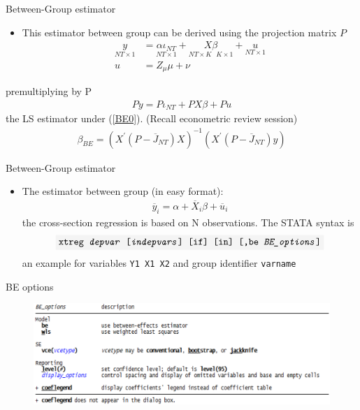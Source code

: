 \begin{frame}{Between-Group estimator}
		\begin{itemize}
			\item This estimator between group can be derived using the projection matrix $P$
					\begin{align*}
						\underset{NT\times 1}{y} & = \underset{NT\times 1}{\alpha \iota 
													 _{NT}}+\underset{NT\times K\text{ }K\times 1}{X\beta }+\underset{NT\times 1}{u} \\
											   u & = Z_{\mu }\mu +\nu
					\end{align*}
		\end{itemize}
	premultiplying by P
		\begin{gather}
			Py=P\iota _{NT}+PX\beta +Pu  \label{BE0}
		\end{gather}
	the LS estimator under (\ref{BE0}). (Recall econometric review session)
		\begin{gather}
			\beta_{BE}=\left( X^{\prime }\left( P-\overline{J}_{NT}\right) X\right)^{-1}\left( X^{\prime}\left( P-\overline{J}_{NT}\right) y\right)
		\end{gather}
\end{frame}
\begin{frame}{Between-Group estimator}
	\begin{itemize}
		\item The estimator between group (in easy format):
			\begin{gather}
				\overline{y}_{i}=\alpha +\overline{X}_{i}\beta +\overline{u}_{i}  \label{BE}
			\end{gather}
		the cross-section regression is based on N observations. The STATA syntax is
			$$\colorbox{codegray}{\texttt{xtreg \textit{depvar} [\textit{indepvars}] [if] [in] [,be \textit{BE\_options}]}}$$
		an example for variables \colorbox{codegray}{\texttt{Y1 X1 X2}} and group identifier \colorbox{codegray}{\texttt{varname}}
	\end{itemize}
\end{frame}
\begin{frame}{BE options}
	\begin{figure}
		\centering
		\includegraphics[width = \linewidth]{figures/panel_05.png}
	\end{figure}
\end{frame}
